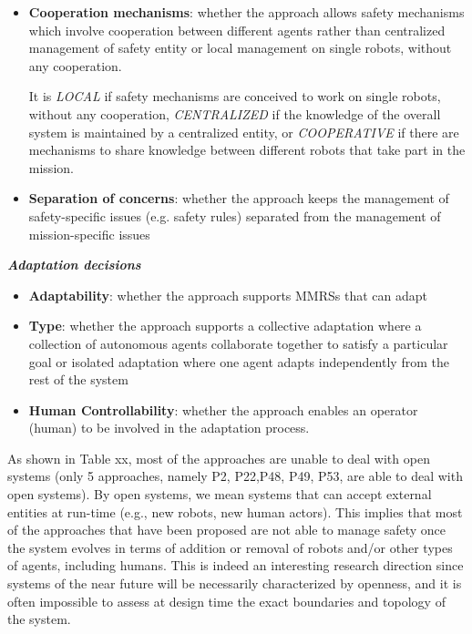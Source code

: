 \documentclass[journal]{IEEEtran}
\theoremstyle{definition}
\begin{document}
\begin{itemize}
\item \textbf{Cooperation mechanisms}: whether the approach allows safety mechanisms which involve cooperation between different agents rather than centralized management of safety entity or local management on
single robots, without any cooperation.

It is \textit{LOCAL} if safety mechanisms are conceived to work  on
single robots, without any cooperation,
\textit{CENTRALIZED} if the knowledge
of the overall system is maintained by a centralized entity,
or \textit{COOPERATIVE} if there are mechanisms to share knowledge between different robots that take part in the
mission.

\item \textbf{Separation of concerns}: whether the approach keeps the management of safety-specific issues (e.g. safety rules)  separated from the management of mission-specific issues
\end{itemize}

\textbf{\textit{Adaptation decisions}} 
\begin{itemize}
    

\item \textbf{Adaptability}: whether the approach supports MMRSs that can adapt
\item \textbf{Type}: whether the approach supports a collective adaptation where a collection of autonomous agents collaborate together to satisfy a particular goal or isolated adaptation where one agent adapts independently from the rest of the system
\item \textbf{Human Controllability}: whether the approach enables an operator (human) to be involved in the adaptation process. 
\end{itemize}


As shown in Table xx, most of the approaches are unable to deal with open systems (only 5 approaches, namely P2, P22,P48, P49, P53, are able to deal with open systems).  By open systems, we mean systems that can accept external entities at run-time (e.g.,  new robots,  new human actors).   This implies that  most  of the  approaches  that  have  been  proposed  are  not able to manage safety once the system evolves in terms of addition or removal of robots and/or other types of agents, including humans.  This is indeed an interesting research direction since  systems of the near future will be necessarily characterized by openness, and it is often impossible to assess at design time the exact boundaries and topology of the system.
\end{document}
